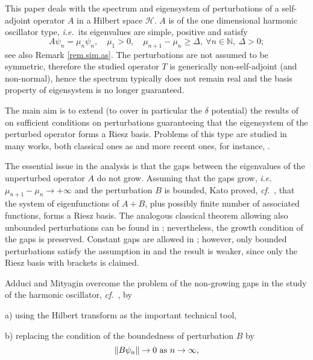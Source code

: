 This paper deals with the spectrum and eigensystem of perturbations of a self-adjoint operator $A$ in a Hilbert space ${{\mathcal{H}}}$. $A$ is of the one dimensional harmonic oscillator type,
{{\emph{i.e.}}}~its eigenvalues are simple, positive and satisfy 
\begin{equation}\label{ass.A}
A \psi_n = \mu_n \psi_n, \quad 
\mu_1 >0, 
\quad
\mu_{n+1} -\mu_n \geq  \Delta, \ \forall n \in {\mathbb{N}}, \ \Delta> 0;
\end{equation}
see also Remark \ref{rem.sim.as}.
The perturbations are not assumed to be symmetric, therefore
the studied operator $T$ is generically non-self-adjoint (and non-normal), 
hence the spectrum typically does not remain real and the basis property of eigensystem is no longer guaranteed.

The main aim is to extend (to cover in particular the $\delta$ potential) the results of \cite{Adduci-2012-10, Adduci-2012-73,Agranovich-1994-28} on sufficient conditions on perturbations guaranteeing that the eigensystem of the perturbed operator forms a Riesz basis. Problems of this type are studied in many works, both classical ones as \cite{DS3,Kato-1966,Markus-1988} and more recent ones, for instance, \cite{Agranovich-1994-28, Shkalikov-2010-269, Wyss-2010-258, Xu-2005-210, Zwart-2010-249}. 

The essential issue in the analysis is that the gaps between the eigenvalues of the unperturbed operator $A$ do not grow. Assuming that the gaps grow, {{\emph{i.e.}}}~$\mu_{n+1}-\mu_n \rightarrow + \infty $ and the perturbation $B$ is bounded, Kato proved, {\emph{cf.}}~\cite[Thm. V.4.15a, Lem. V.4.17a]{Kato-1966}, that the system of eigenfunctions of $A+B$, plus possibly finite number of associated functions, forms a Riesz basis. The analogous classical theorem allowing also unbounded perturbations can be found in \cite[Thm. XIX.2.7]{DS3}; nevertheless, the growth condition of the gaps is preserved. Constant gaps are allowed in \cite{Agranovich-1994-28}; however, only bounded perturbations satisfy the assumption in \cite{Agranovich-1994-28} and the result is weaker, since only the Riesz basis with brackets is claimed.

Adduci and Mityagin overcome the problem of the non-growing gaps in the study of the harmonic oscillator, {\emph{cf.}}~\cite{Adduci-2012-10}, by 

\noindent
a) using the Hilbert transform as the important technical tool,

\noindent
b) replacing the condition of the boundedness of perturbation $B$ by 
\begin{equation}\label{trad.ass.B}
\|B \psi_n \| \rightarrow 0 \ {\rm as} \  n \rightarrow \infty,
\end{equation}

